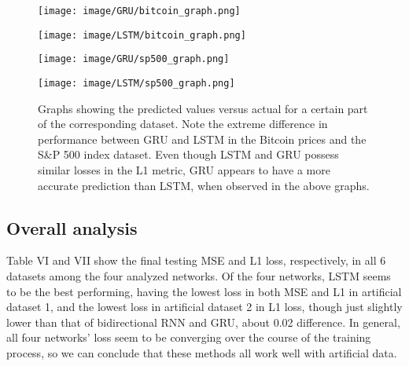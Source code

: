 \documentclass[letterpaper, 10 pt, conference]{ieeeconf}  %
\begin{document}
        \begin{figure*}
            \centering
            \begin{minipage}{\columnwidth}
                \centering
                \texttt{[image: image/GRU/bitcoin\_graph.png]}
                \label{label1}
            \end{minipage}%
            \begin{minipage}{\columnwidth}
                \centering
                \texttt{[image: image/LSTM/bitcoin\_graph.png]}
                \label{label2}
            \end{minipage}
            \begin{minipage}{\columnwidth}
                \centering
                \texttt{[image: image/GRU/sp500\_graph.png]}
                \label{label3}
            \end{minipage}%
            \begin{minipage}{\columnwidth}
                \centering
                \texttt{[image: image/LSTM/sp500\_graph.png]}
                \label{label4}
            \end{minipage}
            \captionsetup{margin=1.5cm}
            \caption{Graphs showing the predicted values versus actual for a certain part of the corresponding dataset. Note the extreme difference in performance between GRU and LSTM in the Bitcoin prices and the S\&P 500 index dataset. Even though LSTM and GRU possess similar losses in the L1 metric, GRU appears to have a more accurate prediction than LSTM, when observed in the above graphs.}
        \end{figure*}
    \subsection{Overall analysis}
        Table VI and VII show the final testing MSE and L1 loss, respectively, in all 6 datasets among the four analyzed networks. Of the four networks, LSTM seems to be the best performing, having the lowest loss in both MSE and L1 in artificial dataset 1, and the lowest loss in artificial dataset 2 in L1 loss, though just slightly lower than that of bidirectional RNN and GRU, about 0.02 difference. In general, all four networks' loss seem to be converging over the course of the training process, so we can conclude that these methods all work well with artificial data.
\end{document}
